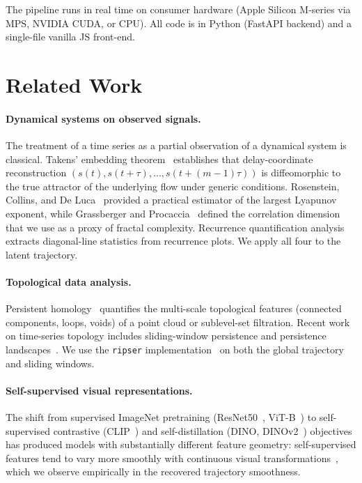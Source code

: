 \documentclass[11pt,a4paper]{article}
\begin{document}
The pipeline runs in real time on consumer hardware (Apple Silicon
M-series via MPS, NVIDIA CUDA, or CPU). All code is in Python (FastAPI
backend) and a single-file vanilla JS front-end.

\section{Related Work}

\paragraph{Dynamical systems on observed signals.}
The treatment of a time series as a partial observation of a
dynamical system is classical. Takens' embedding
theorem~\cite{takens1981} establishes that delay-coordinate
reconstruction $(s(t), s(t+\tau), \dots, s(t+(m-1)\tau))$ is
diffeomorphic to the true attractor of the underlying flow under
generic conditions. Rosenstein, Collins, and De
Luca~\cite{rosenstein1993} provided a practical estimator of the
largest Lyapunov exponent, while Grassberger and
Procaccia~\cite{grassberger1983} defined the correlation dimension
that we use as a proxy of fractal complexity. Recurrence
quantification analysis~\cite{marwan2007recurrence} extracts
diagonal-line statistics from recurrence plots. We apply all four
to the latent trajectory.

\paragraph{Topological data analysis.}
Persistent homology~\cite{edelsbrunner2002topological,
carlsson2009topology} quantifies the multi-scale topological
features (connected components, loops, voids) of a point cloud or
sublevel-set filtration. Recent work on time-series topology
includes sliding-window persistence and persistence
landscapes~\cite{perea2015sw1pers}. We use the \texttt{ripser}
implementation~\cite{tralie2018ripser} on both the global trajectory
and sliding windows.

\paragraph{Self-supervised visual representations.}
The shift from supervised ImageNet pretraining
(ResNet50~\cite{he2016deep}, ViT-B~\cite{dosovitskiy2020vit}) to
self-supervised contrastive (CLIP~\cite{radford2021clip}) and
self-distillation (DINO, DINOv2~\cite{oquab2023dinov2}) objectives
has produced models with substantially different feature geometry:
self-supervised features tend to vary more smoothly with continuous
visual transformations~\cite{caron2021dino}, which we observe
empirically in the recovered trajectory smoothness.
\end{document}
